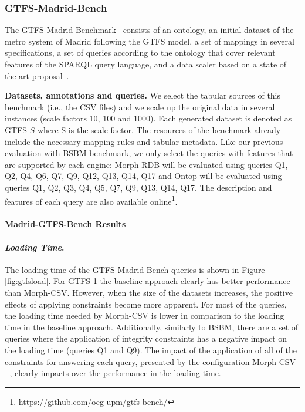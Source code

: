 \subsubsection{GTFS-Madrid-Bench}
The GTFS-Madrid Benchmark~\citep{chaves2020gtfs} consists of an ontology, an initial dataset of the metro system of Madrid following the GTFS model, a set of mappings in several specifications, a set of queries according to the ontology that cover relevant features of the SPARQL query language, and a data scaler based on a state of the art proposal~\citep{lanti2015npd}. 

\noindent\textbf{Datasets, annotations and queries.} We select the tabular sources of this benchmark (i.e., the CSV files) and we scale up the original data in several instances (scale factors 10, 100 and 1000). Each generated dataset is denoted as GTFS-$S$ where S is the scale factor. The resources of the benchmark already include the necessary mapping rules and tabular metadata. Like our previous evaluation with BSBM benchmark, we only select the queries with features that are supported by each engine: Morph-RDB will be evaluated using  queries Q1, Q2, Q4, Q6, Q7, Q9, Q12, Q13, Q14, Q17 and Ontop will be evaluated using  queries Q1, Q2, Q3, Q4, Q5, Q7, Q9, Q13, Q14, Q17. The description and features of each query are also available online\footnote{\url{https://github.com/oeg-upm/gtfs-bench/}}.

\noindent\paragraph*{\textbf{Madrid-GTFS-Bench Results}}

\noindent\paragraph*{\textit{Loading Time}.}
The loading time of the GTFS-Madrid-Bench queries is shown in Figure \ref{fig:gtfsload}. For GTFS-1 the baseline approach clearly has better performance than Morph-CSV. However, when the size of the datasets increases, the positive effects of applying constraints become more apparent. For most of the queries, the loading time needed by Morph-CSV is lower in comparison to the loading time in the baseline approach. Additionally, similarly to BSBM, there are a set of queries where the application of integrity constraints has a negative impact on the loading time (queries Q1 and Q9). The impact of the application of all of the constraints for answering each query, presented by the configuration Morph-CSV$^-$, clearly impacts over the performance in the loading time.

